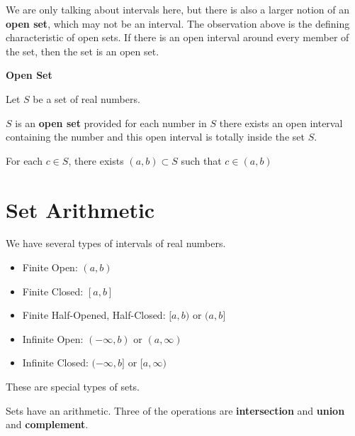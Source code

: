 \documentclass{ximera}
\begin{document}
We are only talking about intervals here, but there is also a larger notion of an \textbf{open set}, which may not be an interval.  The observation above is the defining characteristic of open sets.  If there is an open interval around every member of the set, then the set is an open set.




\begin{idea}  \textbf{\textcolor{blue!55!black}{Open Set}} 


Let $S$ be a set of real numbers. 

$S$ is an \textbf{open set} provided for each number in $S$ there exists an open interval containing the number and this open interval is totally inside the set $S$.

\begin{center}
For each $c \in S$, there exists $(a,b) \subset S$ such that $c \in (a,b)$
\end{center}

\end{idea}







\section*{Set Arithmetic}


We have several types of intervals of real numbers.


\begin{itemize}
\item Finite Open:   $(a, b)$
\item Finite Closed: $[a, b]$
\item Finite Half-Opened, Half-Closed:  $[a, b)$  or $(a,b]$ 

\item Infinite Open: $(-\infty, b)$ or $(a, \infty)$
\item Infinite Closed: $(-\infty, b]$ or $[a, \infty)$

\end{itemize}

These are special types of sets.


Sets have an arithmetic. Three of the operations are \textbf{intersection} and \textbf{union} and \textbf{complement}.
\end{document}
